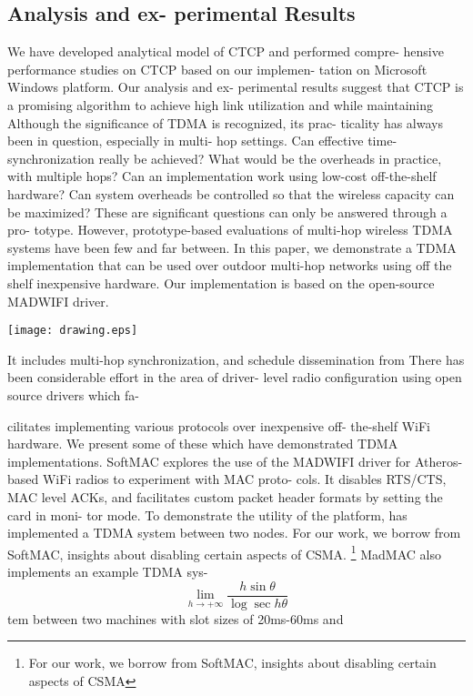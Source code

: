 \documentclass[a4paper,11pt,twocolumn,dvips]{report}
\begin{document}
\subsection{Analysis and ex-
perimental Results }
We have
developed analytical model of CTCP and performed compre-
hensive performance studies on CTCP based on our implemen-
tation on Microsoft Windows platform. Our analysis and ex-
perimental results suggest that CTCP is a promising algorithm
to achieve high link utilization and while maintaining
Although\cite{sample6} the significance of TDMA is recognized, its prac-
ticality has always been in question, especially in multi-
hop settings. Can effective time-synchronization really be
achieved? What would be the overheads in practice, with
multiple hops? Can an implementation work using low-cost
off-the-shelf hardware? Can system overheads be controlled
so that the wireless capacity can be maximized? These are
significant questions can only be answered through a pro-
totype. However, prototype-based evaluations of multi-hop\cite{sample2}
wireless TDMA systems have been few and far between.
In this paper, we demonstrate a TDMA implementation
that can be used over outdoor multi-hop networks using
off the shelf inexpensive hardware. Our implementation
is based on the open-source MADWIFI driver.
\begin{figure*}
\label{fig-circles}
\centering
\texttt{[image: drawing.eps]}
\end{figure*}

It includes
multi-hop synchronization, and schedule dissemination from
There has been considerable effort in the area of driver-
level radio configuration using open source drivers which fa-

cilitates implementing various protocols over inexpensive off-
the-shelf WiFi hardware. We present some of these which
have demonstrated TDMA implementations.
SoftMAC  explores the use of the MADWIFI driver for
Atheros-based WiFi radios to experiment with MAC proto-
cols. It disables RTS/CTS, MAC level ACKs, and facilitates
custom packet header formats by setting the card in moni-
tor mode. To demonstrate the utility of the platform,  has\cite{sample3}
implemented a TDMA system between two nodes. For our
work, we borrow from SoftMAC, insights about disabling
certain aspects of CSMA.
\footnote{ For our
work, we borrow from SoftMAC, insights about disabling
certain aspects of CSMA}
MadMAC  also implements an example TDMA sys-
\begin{equation}
\label{eq-equation1}
\lim_{h \to +\infty} \frac{h\sin\theta}{\log \sec h\theta}
\end{equation}
tem between two machines with slot sizes of 20ms-60ms and
\end{document}
